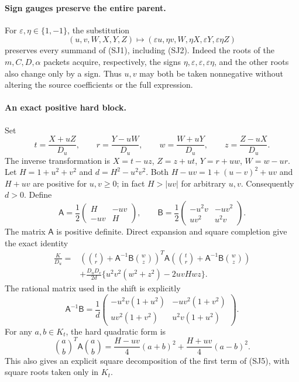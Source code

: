 \paragraph{Sign gauges preserve the entire parent.}
For $\varepsilon,\eta\in\{1,-1\}$, the substitution
\[
 (u,v,W,X,Y,Z)\longmapsto
 (\varepsilon u,\eta v,W,\eta X,\varepsilon Y,
  \varepsilon\eta Z)                                      \tag{SJ3}
\]
preserves every summand of (SJ1), including (SJ2).  Indeed the roots of the
$m,C,D,\alpha$ packets acquire, respectively, the signs
$\eta,\varepsilon,\varepsilon,\varepsilon\eta$, and the other roots also
change only by a sign.  Thus $u,v$ may both be taken nonnegative without
altering the source coefficients or the full expression.

\paragraph{An exact positive hard block.}
Set
\[
 t=\frac{X+uZ}{D_u},\qquad r=\frac{Y-uW}{D_u},\qquad
 w=\frac{W+uY}{D_u},\qquad z=\frac{Z-uX}{D_u}.             \tag{SJ4}
\]
The inverse transformation is
$X=t-uz$, $Z=z+ut$, $Y=r+uw$, $W=w-ur$.
Let $H=1+u^2+v^2$ and $d=H^2-u^2v^2$.  Both
$H-uv=1+(u-v)^2+uv$ and $H+uv$ are positive for $u,v\geq0$;
in fact $H>|uv|$ for arbitrary $u,v$.  Consequently $d>0$.
Define
\[
 \mathsf A=\frac12\begin{pmatrix}H&-uv\\-uv&H\end{pmatrix},\qquad
 \mathsf B=\frac12\begin{pmatrix}-u^2v&-uv^2\\uv^2&u^2v\end{pmatrix}.
\]
The matrix $\mathsf A$ is positive definite.  Direct expansion and square
completion give the exact identity
\begin{align}
 \frac K{D_u}
 ={}&\left(\binom tr+\mathsf A^{-1}\mathsf B\binom wz\right)^{\!T}
       \mathsf A
       \left(\binom tr+\mathsf A^{-1}\mathsf B\binom wz\right)\\
    &+\frac{D_uD_v}{2d}
       \{u^2v^2(w^2+z^2)-2uvH wz\}.                    \tag{SJ5}
\end{align}
The rational matrix used in the shift is explicitly
\[
 \mathsf A^{-1}\mathsf B=
 \frac1d\begin{pmatrix}
 -u^2v(1+u^2)&-uv^2(1+v^2)\\
 uv^2(1+v^2)&u^2v(1+u^2)
 \end{pmatrix}.                                         \tag{SJ6}
\]
For any $a,b\in K_t$, the hard quadratic form is
\[
 \binom{a}{b}^{\!T}\mathsf A\binom{a}{b}
   =\frac{H-uv}{4}(a+b)^2+\frac{H+uv}{4}(a-b)^2.         \tag{SJ7}
\]
This also gives an explicit square decomposition of the first term of
(SJ5), with square roots taken only in $K_t$.

